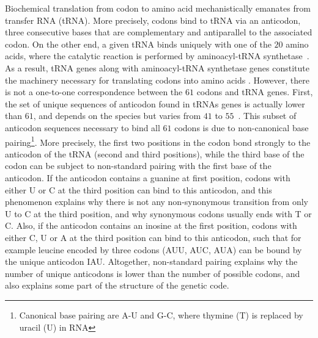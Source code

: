 Biochemical translation from codon to amino acid mechanistically emanates from transfer \acrshort{RNA} (\acrshort{tRNA}).
More precisely, codons bind to \acrshort{tRNA} via an anticodon, three consecutive bases that are complementary and antiparallel to the associated codon.
On the other end, a given \acrshort{tRNA} binds uniquely with one of the $20$ amino acids, where the catalytic reaction is performed by aminoacyl-tRNA synthetase~\citep{Rich1976}.
As a result, \acrshort{tRNA} genes along with aminoacyl-tRNA synthetase genes constitute the machinery necessary for translating codons into amino acids .
However, there is not a one-to-one correspondence between the $61$ codons and \acrshort{tRNA} genes.
First, the set of unique sequences of anticodon found in tRNAs genes is actually lower than $61$, and depends on the species but varies from $41$ to $55$~\citep{Goodenbour2006}.
This subset of anticodon sequences necessary to bind all $61$ codons is due to non-canonical base pairing\footnote{Canonical base pairing are A-U and G-C, where thymine (T) is replaced by uracil (U) in RNA}.
More precisely, the first two positions in the codon bond strongly to the anticodon of the \acrshort{tRNA} (second and third positions), while the third base of the codon can be subject to non-standard pairing with the first base of the anticodon.
If the anticodon contains a guanine at first position, codons with either U or C at the third position can bind to this anticodon, and this phenomenon explains why there is not any non-synonymous transition from only U to C at the third position, and why synonymous codons usually ends with T or C.
Also, if the anticodon contains an inosine at the first position, codons with either C, U or A at the third position can bind to this anticodon, such that for example leucine encoded by three codons (AUU, AUC, AUA) can be bound by the unique anticodon IAU.
Altogether, non-standard pairing explains why the number of unique anticodons is lower than the number of possible codons, and also explains some part of the structure of the genetic code.

